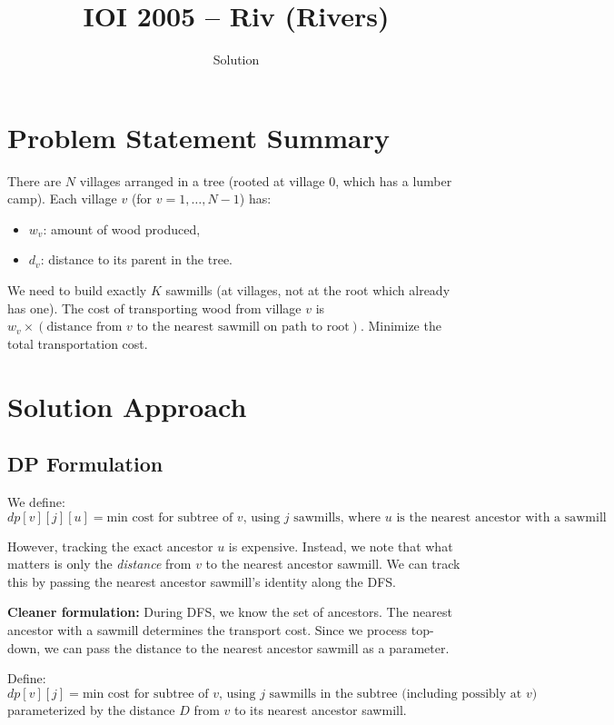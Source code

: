 \documentclass[11pt,a4paper]{article}
\title{IOI 2005 -- Riv (Rivers)}
\author{Solution}
\date{}
\begin{document}
\maketitle

\section{Problem Statement Summary}
There are $N$ villages arranged in a tree (rooted at village 0, which has a lumber camp). Each village $v$ (for $v = 1, \ldots, N-1$) has:
\begin{itemize}
    \item $w_v$: amount of wood produced,
    \item $d_v$: distance to its parent in the tree.
\end{itemize}

We need to build exactly $K$ sawmills (at villages, not at the root which already has one). The cost of transporting wood from village $v$ is $w_v \times (\text{distance from } v \text{ to the nearest sawmill on path to root})$. Minimize the total transportation cost.

\section{Solution Approach}

\subsection{DP Formulation}
We define:
\[
dp[v][j][u] = \text{min cost for subtree of } v \text{, using } j \text{ sawmills, where } u \text{ is the nearest ancestor with a sawmill}
\]

However, tracking the exact ancestor $u$ is expensive. Instead, we note that what matters is only the \emph{distance} from $v$ to the nearest ancestor sawmill. We can track this by passing the nearest ancestor sawmill's identity along the DFS.

\textbf{Cleaner formulation:} During DFS, we know the set of ancestors. The nearest ancestor with a sawmill determines the transport cost. Since we process top-down, we can pass the distance to the nearest ancestor sawmill as a parameter.

Define:
\[
dp[v][j] = \text{min cost for subtree of } v \text{, using } j \text{ sawmills in the subtree (including possibly at } v\text{)}
\]
parameterized by the distance $D$ from $v$ to its nearest ancestor sawmill.
\end{document}
